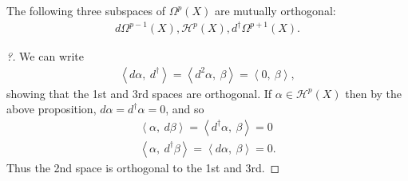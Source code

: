 \begin{proposition}[?]

The following three subspaces of \(\Omega^p(X)\) are mutually
orthogonal:
\begin{align*}
d \Omega^{p-1}(X), \mathcal{H}^p(X), d^\dagger \Omega^{p+1}(X) 
.\end{align*}

\end{proposition}

\begin{proof}[?]

We can write
\begin{align*}
{\left\langle { d \alpha},~{ d^\dagger } \right\rangle} = 
{\left\langle { d^2 \alpha},~{ \beta} \right\rangle} =
{\left\langle {0},~{ \beta} \right\rangle}
,\end{align*}
showing that the 1st and 3rd spaces are orthogonal. If
\(\alpha\in \mathcal{H}^p(X)\) then by the above proposition,
\(d \alpha = d^\dagger \alpha = 0\), and so
\begin{align*}
{\left\langle { \alpha },~{ d \beta} \right\rangle} = {\left\langle {d^\dagger \alpha},~{ \beta} \right\rangle} = 0 \\
{\left\langle { \alpha },~{ d^\dagger \beta} \right\rangle} = {\left\langle {d \alpha},~{ \beta} \right\rangle} = 0
.\end{align*}
Thus the 2nd space is orthogonal to the 1st and 3rd.

\end{proof}

